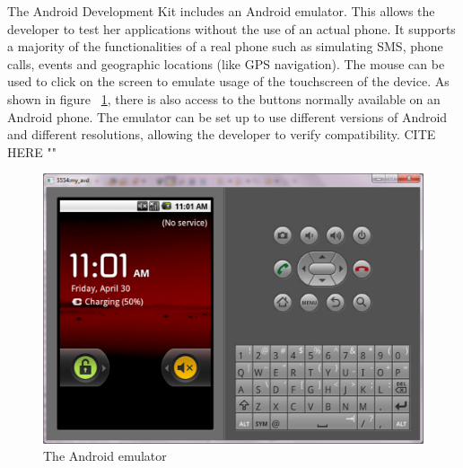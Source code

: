 The Android Development Kit includes an Android emulator. This allows the developer to test her applications without the use of an actual phone. It supports a majority of the functionalities of a real phone such as simulating SMS, phone calls, events and geographic locations (like GPS navigation). The mouse can be used to click on the screen to emulate usage of the touchscreen of the device. As shown in figure ~\ref{fig:androidEmulator}, there is also access to the buttons normally available on an Android phone. The emulator can be set up to use different versions of Android and different resolutions, allowing the developer to verify compatibility. CITE HERE ""

\clearpage
\begin{figure}[here]
\begin{center}
\includegraphics[scale=0.4]{pics/chapters/chapter2/emulator}
\end{center}
\caption{The Android emulator}
\label{fig:androidEmulator}
\end{figure}
